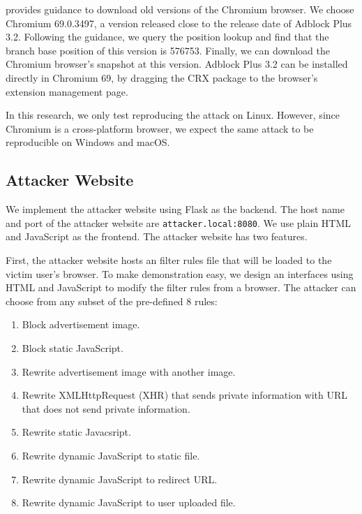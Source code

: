 \documentclass[conference]{IEEEtran}
\begin{document}
\cite{chromium_old_download} provides guidance to download old versions of the Chromium browser. We choose Chromium 69.0.3497, a version released close to the release date of Adblock Plus 3.2.
Following the guidance, we query the position lookup and find that the branch base position of this version is 576753. Finally, we can download the Chromium browser's snapshot at this version. Adblock Plus 3.2 can be installed directly in Chromium 69, by dragging the CRX package to the browser's extension management page.

In this research, we only test reproducing the attack on Linux. However, since Chromium is a cross-platform browser, we expect the same attack to be reproducible on Windows and macOS.

\subsection{Attacker Website}

We implement the attacker website using Flask as the backend. The host name and port of the attacker website are \lstinline{attacker.local:8080}. We use plain HTML and JavaScript as the frontend. The attacker website has two features.

First, the attacker website hosts an filter rules file that will be loaded to the victim user's browser. To make demonstration easy, we design an interfaces using HTML and JavaScript to modify the filter rules from a browser. The attacker can choose from any subset of the pre-defined 8 rules:

\begin{enumerate}
	\item Block advertisement image.
	\item Block static JavaScript.
	\item Rewrite advertisement image with another image.
	\item Rewrite XMLHttpRequest (XHR) that sends private information with URL that does not send private information.
	\item Rewrite static Javacsript.
	\item Rewrite dynamic JavaScript to static file.
	\item Rewrite dynamic JavaScript to redirect URL.
	\item Rewrite dynamic JavaScript to user uploaded file.
\end{enumerate}
\end{document}
